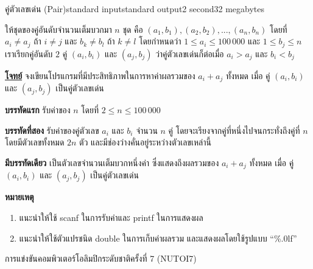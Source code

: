 \documentclass[11pt,a4paper]{article}
\begin{document}
\begin{problem}{คู่ตัวเลขเด่น (Pair)}{standard input}{standard output}{2 second}{32 megabytes}

ให้ชุดของคู่อันดับจำนวนเต็มบวกมา $n$ ชุด คือ $(a_1,b_1), (a_2,b_2), ..., (a_n,b_n)$ โดยที่ $a_i \neq a_j$ ถ้า $i \neq j$ และ $b_k \neq b_l$ ถ้า $k \neq l$ โดยกำหนดว่า $1 \leq a_i \leq 100\,000$  และ $1 \leq b_j \leq n$ เราเรียกคู่อันดับ $2$ คู่ $(a_i,b_i)$ และ $(a_j,b_j)$ ว่าคู่ตัวเลขเด่นก็ต่อเมื่อ $a_i > a_j$ และ $b_i < b_j$



\bigskip
\underline{\textbf{โจทย์}}  จงเขียนโปรแกรมที่มีประสิทธิภาพในการหาค่าผลรวมของ $a_i + a_j$ ทั้งหมด เมื่อ คู่ $(a_i,b_i)$ และ $(a_j,b_j)$ เป็นคู่ตัวเลขเด่น


\InputFile

\textbf{บรรทัดแรก} รับค่าของ $n$ โดยที่ $2 \leq n \leq 100\,000$

\textbf{บรรทัดที่สอง} รับค่าของคู่ตัวเลข $a_i$ และ $b_i$ จำนวน $n$ คู่ โดยจะเรียงจากคู่ที่หนึ่งไปจนกระทั่งถึงคู่ที่ $n$ โดยมีตัวเลขทั้งหมด $2n$  ตัว และมีช่องว่างคั่นอยู่ระหว่างตัวเลขเหล่านี้

\OutputFile

\textbf{มีบรรทัดเดียว} เป็นตัวเลขจำนวนเต็มบวกหนึ่งค่า ซึ่งแสดงถึงผลรวมของ $a_i + a_j$ ทั้งหมด เมื่อ คู่ $(a_i,b_i)$ และ $(a_j,b_j)$ เป็นคู่ตัวเลขเด่น

\bigskip
\textbf{หมายเหตุ}
\begin{enumerate}

\item แนะนำให้ใช้ scanf ในการรับค่าและ printf ในการแสดงผล
\item แนะนำให้ใช้ตัวแปรชนิด double ในการเก็บค่าผลรวม และแสดงผลโดยใช้รูปแบบ “\%.0lf”
\end{enumerate}

\Examples

\begin{example}
%
%
\end{example}

  
\Source

การแข่งขันคอมพิวเตอร์โอลิมปิกระดับชาติครั้งที่ 7 (NUTOI7)

\end{problem}
\end{document}
